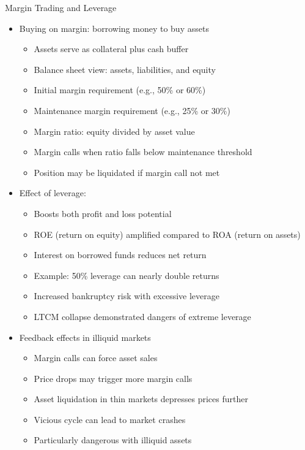 \documentclass[10pt,handout]{beamer}
\begin{document}
\begin{frame}{Margin Trading and Leverage}
  \begin{itemize}[<+->]
    \item Buying on margin: borrowing money to buy assets
      \begin{itemize}
        \item Assets serve as collateral plus cash buffer
        \item Balance sheet view: assets, liabilities, and equity
        \item Initial margin requirement (e.g., 50\% or 60\%)
        \item Maintenance margin requirement (e.g., 25\% or 30\%)
        \item Margin ratio: equity divided by asset value
        \item Margin calls when ratio falls below maintenance threshold
        \item Position may be liquidated if margin call not met
      \end{itemize}
    \item Effect of leverage:
      \begin{itemize}
        \item Boosts both profit and loss potential
        \item ROE (return on equity) amplified compared to ROA (return on assets)
        \item Interest on borrowed funds reduces net return
        \item Example: 50\% leverage can nearly double returns
        \item Increased bankruptcy risk with excessive leverage
        \item LTCM collapse demonstrated dangers of extreme leverage
      \end{itemize}
    \item Feedback effects in illiquid markets
      \begin{itemize}
        \item Margin calls can force asset sales
        \item Price drops may trigger more margin calls
        \item Asset liquidation in thin markets depresses prices further
        \item Vicious cycle can lead to market crashes
        \item Particularly dangerous with illiquid assets
      \end{itemize}
  \end{itemize}
\end{frame}
\end{document}
